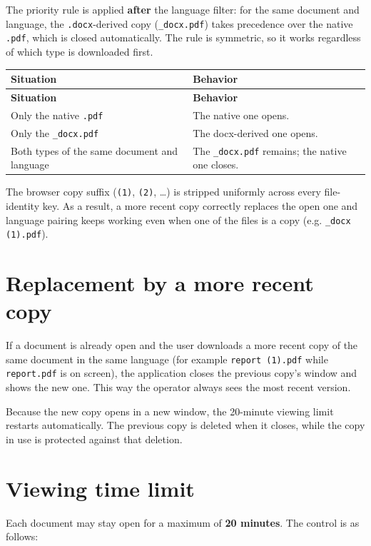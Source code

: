 \documentclass[11pt,a4paper]{article}
\begin{document}
The priority rule is applied \textbf{after} the language filter: for the same
document and language, the \texttt{.docx}-derived copy (\texttt{\_docx.pdf}) takes
precedence over the native \texttt{.pdf}, which is closed automatically. The rule
is symmetric, so it works regardless of which type is downloaded first.

\begin{xltabular}{\textwidth}{@{} L L @{}}
\toprule
\textbf{Situation} & \textbf{Behavior} \\
\midrule
\endfirsthead
\toprule
\textbf{Situation} & \textbf{Behavior} \\
\midrule
\endhead
\bottomrule
\endfoot
Only the native \texttt{.pdf} & The native one opens. \\
Only the \texttt{\_docx.pdf} & The docx-derived one opens. \\
Both types of the same document and language & The \texttt{\_docx.pdf} remains; the native one closes. \\
\bottomrule
\end{xltabular}

The browser copy suffix (\texttt{(1)}, \texttt{(2)}, \ldots) is stripped uniformly
across every file-identity key. As a result, a more recent copy correctly replaces
the open one and language pairing keeps working even when one of the files is a
copy (e.g. \texttt{\_docx (1).pdf}).

\section{Replacement by a more recent copy}
If a document is already open and the user downloads a more recent copy of the
same document in the same language (for example \texttt{report (1).pdf} while
\texttt{report.pdf} is on screen), the application closes the previous copy's
window and shows the new one. This way the operator always sees the most recent
version.

Because the new copy opens in a new window, the 20-minute viewing limit restarts
automatically. The previous copy is deleted when it closes, while the copy in use
is protected against that deletion.

\section{Viewing time limit}
Each document may stay open for a maximum of \textbf{20 minutes}. The control is
as follows:
\end{document}
